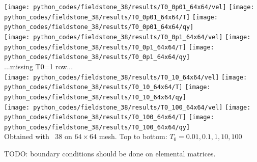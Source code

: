 \begin{center}
\texttt{[image: python\_codes/fieldstone\_38/results/T0\_0p01\_64x64/vel]}
\texttt{[image: python\_codes/fieldstone\_38/results/T0\_0p01\_64x64/T]}
\texttt{[image: python\_codes/fieldstone\_38/results/T0\_0p01\_64x64/qy]}\\
\texttt{[image: python\_codes/fieldstone\_38/results/T0\_0p1\_64x64/vel]}
\texttt{[image: python\_codes/fieldstone\_38/results/T0\_0p1\_64x64/T]}
\texttt{[image: python\_codes/fieldstone\_38/results/T0\_0p1\_64x64/qy]}\\
...missing T0=1 row...\\
\texttt{[image: python\_codes/fieldstone\_38/results/T0\_10\_64x64/vel]}
\texttt{[image: python\_codes/fieldstone\_38/results/T0\_10\_64x64/T]}
\texttt{[image: python\_codes/fieldstone\_38/results/T0\_10\_64x64/qy]}\\
\texttt{[image: python\_codes/fieldstone\_38/results/T0\_100\_64x64/vel]}
\texttt{[image: python\_codes/fieldstone\_38/results/T0\_100\_64x64/T]}
\texttt{[image: python\_codes/fieldstone\_38/results/T0\_100\_64x64/qy]}\\
{\captionfont Obtained with \stone~38 on $64\times64$ mesh. 
Top to bottom: $T_0=0.01,0.1,1,10,100$}
\end{center}




TODO: boundary conditions should be done on elemental matrices.




